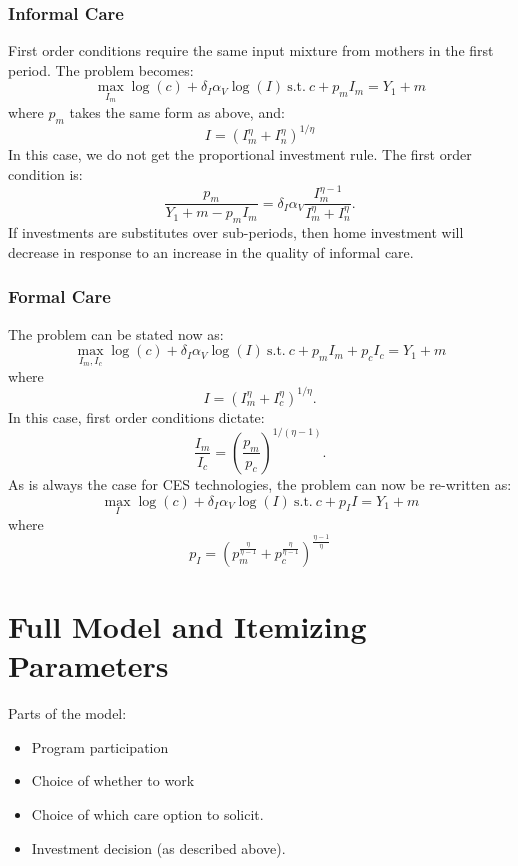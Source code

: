 \documentclass[12pt]{article}
\numberwithin{equation}{section}
\numberwithin{figure}{section}
\numberwithin{table}{section}
\begin{document}
\subsubsection{Informal Care}
First order conditions require the same input mixture from mothers in the first period. The problem becomes:
\[\max_{I_m} \log(c) + \delta_{I}\alpha_{V}\log(I)\ \text{s.t.}\ c + p_mI_m = Y_1 + m \]
where $p_m$ takes the same form as above, and:
\[ I = \left(I_m^\eta + I_n^\eta\right)^{1/\eta} \]
In this case, we do not get the proportional investment rule. The first order condition is:
\[\frac{p_m}{Y_1 + m - p_mI_m} = \delta_I\alpha_V\frac{I_m^{\eta-1}}{I_m^\eta + I_n^\eta}.\]
If investments are substitutes over sub-periods, then home investment will decrease in response to an increase in the quality of informal care.


\subsubsection{Formal Care}
The problem can be stated now as:
\[\max_{I_m,I_c} \log(c) + \delta_{I}\alpha_{V}\log(I)\ \text{s.t.}\ c + p_mI_m + p_cI_c = Y_1 + m \]
where
\[ I = \left(I_m^\eta + I_c^\eta\right)^{1/\eta}.\]
In this case, first order conditions dictate:
\[ \frac{I_m}{I_c} = \left(\frac{p_m}{p_c}\right)^{1/(\eta-1)} .\]
As is always the case for CES technologies, the problem can now be re-written as:
\[\max_{I} \log(c) + \delta_{I}\alpha_{V}\log(I)\ \text{s.t.}\ c + p_I I = Y_1 + m \]
where
\[ p_I = \left(p_m^\frac{\eta}{\eta-1} + p_c^\frac{\eta}{\eta-1}\right)^\frac{\eta-1}{\eta} \]



\section{Full Model and Itemizing Parameters}
Parts of the model:
\begin{itemize}
\item Program participation
\item Choice of whether to work
\item Choice of which care option to solicit.
\item Investment decision (as described above).
\end{itemize}
\end{document}
